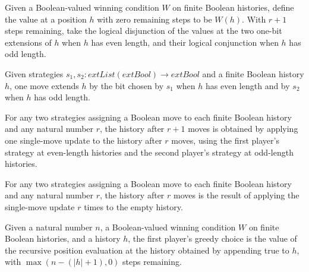 \begin{definition}
\label{Complexity.Game.positionValue}
\leanok
Given a Boolean-valued winning condition $W$ on finite Boolean histories, define the
value at a position $h$ with zero remaining steps to be $W(h)$. With $r+1$ steps
remaining, take the logical disjunction of the values at the two one-bit extensions of
$h$ when $h$ has even length, and their logical conjunction when $h$ has odd length.
\end{definition}

\begin{definition}
\label{Complexity.Game.ply}
\leanok
Given strategies $s_1,s_2 : 	ext{List}(	ext{Bool})\to	ext{Bool}$ and a finite Boolean
history $h$, one move extends $h$ by the bit chosen by $s_1$ when $h$ has even length
and by $s_2$ when $h$ has odd length.
\end{definition}

\begin{theorem}
\label{Complexity.Game.playOut_succ_ply}
\leanok
{}
For any two strategies assigning a Boolean move to each finite Boolean history and any
natural number $r$, the history after $r+1$ moves is obtained by applying one
single-move update to the history after $r$ moves, using the first player's strategy at
even-length histories and the second player's strategy at odd-length histories.
\end{theorem}

\begin{theorem}
\label{Complexity.Game.playOut_eq_iterate}
\leanok
{}
For any two strategies assigning a Boolean move to each finite Boolean history and any
natural number $r$, the history after $r$ moves is the result of applying the
single-move update $r$ times to the empty history.
\end{theorem}

\begin{definition}
\label{Complexity.Game.firstGreedy}
\leanok
{}
Given a natural number $n$, a Boolean-valued winning condition $W$ on finite Boolean
histories, and a history $h$, the first player's greedy choice is the value of the
recursive position evaluation at the history obtained by appending true to $h$, with
$\max(n-(|h|+1),0)$ steps remaining.
\end{definition}

